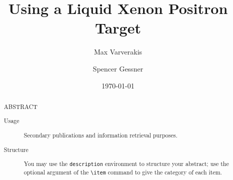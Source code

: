 \documentclass[%
reprint,
amsmath, amssymb,
aps,
floatfix,
]{revtex4-2}
\begin{document}

\title{Using a Liquid Xenon Positron Target}%

\author{Max Varverakis}
\author{Spencer Gessner}%
%




\date{\today}

\begin{abstract}
ABSTRACT
\begin{description}
\item[Usage]
Secondary publications and information retrieval purposes.
\item[Structure]
You may use the \texttt{description} environment to structure your abstract;
use the optional argument of the \verb+\item+ command to give the category of each item. 
\end{description}
\end{abstract}

\maketitle

\end{document}
